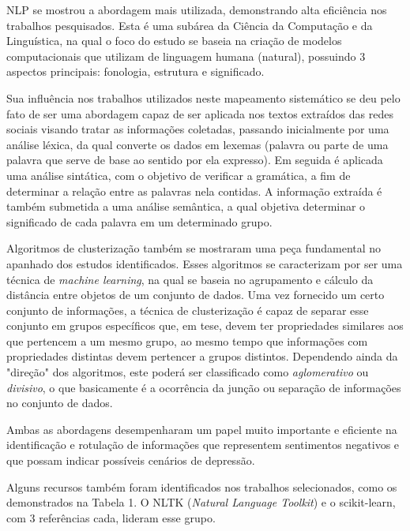 \documentclass[conference]{IEEEtran}
\begin{document}
NLP se mostrou a abordagem mais utilizada, demonstrando alta eficiência nos trabalhos pesquisados. Esta é uma subárea da Ciência da Computação e da Linguística, na qual o foco do estudo se baseia na criação de modelos computacionais que utilizam de linguagem humana (natural), possuindo 3 aspectos principais: fonologia, estrutura e significado.

Sua influência nos trabalhos utilizados neste mapeamento sistemático se deu pelo fato de ser uma abordagem capaz de ser aplicada nos textos extraídos das redes sociais visando tratar as informações coletadas, passando inicialmente por uma análise léxica, da qual converte os dados em lexemas (palavra ou parte de uma palavra que serve de base ao sentido por ela expresso). Em seguida é aplicada uma análise sintática, com o objetivo de verificar a gramática, a fim de determinar a relação entre as palavras nela contidas. A informação extraída é também submetida a uma análise semântica, a qual objetiva determinar o significado de cada palavra em um determinado grupo.

Algoritmos de clusterização também se mostraram uma peça fundamental no apanhado dos estudos identificados. Esses algoritmos se caracterizam por ser uma técnica de \textit{machine learning}, na qual se baseia no agrupamento e cálculo da distância entre objetos de um conjunto de dados. Uma vez fornecido um certo conjunto de informações, a técnica de clusterização é capaz de separar esse conjunto em grupos específicos que, em tese, devem ter propriedades similares aos que pertencem a um mesmo grupo, ao mesmo tempo que informações com propriedades distintas devem pertencer a grupos distintos. Dependendo ainda da "direção" dos algoritmos, este poderá ser classificado como \textit{aglomerativo} ou \textit{divisivo}, o que basicamente é a ocorrência da junção ou separação de informações no conjunto de dados.

Ambas as abordagens desempenharam um papel muito importante e eficiente na identificação e rotulação de informações que representem sentimentos negativos e que possam indicar possíveis cenários de depressão.

Alguns recursos também foram identificados nos trabalhos selecionados, como os demonstrados na Tabela 1. O NLTK (\textit{Natural Language Toolkit}) e o scikit-learn, com 3 referências cada, lideram esse grupo.
\end{document}
